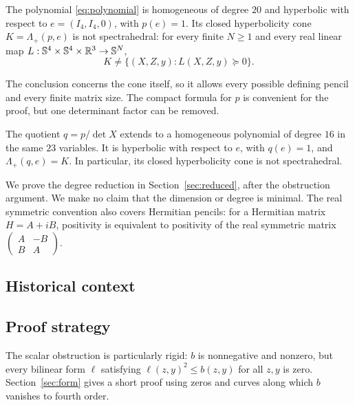 \begin{theorem}\label{thm:main}
The polynomial \eqref{eq:polynomial} is homogeneous of degree $20$ and
hyperbolic with respect to $e=(I_4,I_4,0)$, with $p(e)=1$.
Its closed hyperbolicity cone $K=\Lambda_+(p,e)$ is not spectrahedral:
for every finite $N\geq1$ and every real linear map
$L:\mathbb S^4\times\mathbb S^4\times\mathbb R^3\to\mathbb S^N$,
\[
 K\ne\{(X,Z,y):L(X,Z,y)\succeq0\}.
\]
\end{theorem}

The conclusion concerns the cone itself, so it allows every possible
defining pencil and every finite matrix size. The compact formula for $p$
is convenient for the proof, but one determinant factor can be removed.

\begin{corollary}\label{cor:reduced}
The quotient $q=p/\det X$ extends to a homogeneous polynomial of degree
$16$ in the same $23$ variables. It is hyperbolic with respect to $e$,
with $q(e)=1$, and $\Lambda_+(q,e)=K$. In particular, its closed
hyperbolicity cone is not spectrahedral.
\end{corollary}

We prove the degree reduction in Section~\ref{sec:reduced}, after the
obstruction argument. We make no claim that the dimension or degree is
minimal. The real symmetric convention also covers Hermitian pencils:
for a Hermitian matrix $H=A+iB$, positivity is equivalent to positivity
of the real symmetric matrix $\left(\begin{smallmatrix}A&-B\\B&A\end{smallmatrix}\right)$.

\subsection{Historical context}



\subsection{Proof strategy}

The scalar obstruction is particularly rigid: $b$ is nonnegative and
nonzero, but every bilinear form $\ell$ satisfying $\ell(z,y)^2\leq b(z,y)$
for all $z,y$ is zero. Section~\ref{sec:form} gives a short proof using
zeros and curves along which $b$ vanishes to fourth order.

